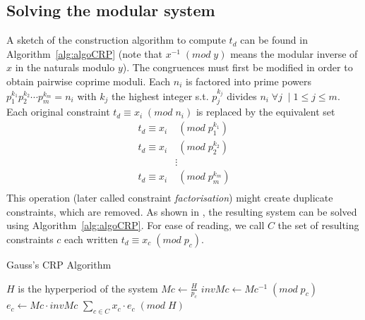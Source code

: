 \documentclass[conference]{IEEEtran}
\begin{document}
	\subsection{Solving the modular system}
		A sketch of the construction algorithm to compute $t_d$ can be found in
		Algorithm~\ref{alg:algoCRP} (note that $x^{-1} \; (mod \; y)$ means the
		modular inverse of $x$ in the naturals modulo $y$). The congruences must
		first be modified in order to obtain pairwise coprime moduli. Each $n_i$
		is factored into prime powers $p^{k_1}_1 p^{k_2}_2 \cdots p^{k_m}_m = n_i$
		with $k_j$ the highest integer s.t. $p^{k_j}_j$ divides $n_i \; \forall j
		\; \mid 1 \leqslant j \leqslant m$. Each original constraint $t_d \equiv x_i
		\; (mod \; n_i)$ is replaced by the equivalent set \cite{knuth1969art}
		\begin{equation*}
			\begin{split}
				t_d \equiv x_i 	& \; (mod \; p^{k_1}_1) \\
				t_d \equiv x_i 	& \; (mod \; p^{k_2}_2) \\
								& \vdots \\
				t_d \equiv x_i 	& \; (mod \; p^{k_m}_m) \\
			\end{split}
		\end{equation*}
		This operation (later called constraint \emph{factorisation}) might create
		duplicate constraints, which are removed.
		As shown in \cite{knuth1969art}, the resulting system can be solved using
		Algorithm~\ref{alg:algoCRP}. For ease of reading, we call $C$ the set of
		resulting constraints $c$ each written $t_d \equiv x_c \; (mod \;
		p_c)$.
		
		\begin{algorithm}
			\caption{Gauss's CRP Algorithm}
			\label{alg:algoCRP}
			\begin{algorithmic}[1]
				\REQUIRE $H$ is the hyperperiod of the system
					\STATE $Mc \leftarrow \frac{H}{p_c}$
					\STATE $invMc \leftarrow Mc^{-1} \; (mod \; p_c)$
					\STATE $e_c \leftarrow Mc \cdot invMc$
				\ENDFOR
				\RETURN $\sum\limits_{c \in C}{x_c \cdot e_c} \; (mod \; H)$
			\end{algorithmic}
		\end{algorithm}
		
\end{document}
